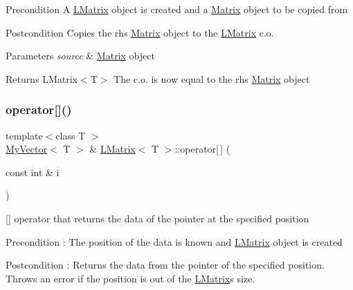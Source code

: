 \begin{DoxyPrecond}{Precondition}
A \mbox{\hyperlink{class_l_matrix}{L\+Matrix}} object is created and a \mbox{\hyperlink{class_matrix}{Matrix}} object to be copied from 
\end{DoxyPrecond}
\begin{DoxyPostcond}{Postcondition}
Copies the rhs \mbox{\hyperlink{class_matrix}{Matrix}} object to the \mbox{\hyperlink{class_l_matrix}{L\+Matrix}} c.\+o. 
\end{DoxyPostcond}

\begin{DoxyParams}{Parameters}
{\em source} & \mbox{\hyperlink{class_matrix}{Matrix}} object \\
\hline
\end{DoxyParams}
\begin{DoxyReturn}{Returns}
L\+Matrix$<$\+T$>$ The c.\+o. is now equal to the rhs \mbox{\hyperlink{class_matrix}{Matrix}} object 
\end{DoxyReturn}
\mbox{\label{class_l_matrix_a7eab2a6c57437448d21a04484844e359}} 
\subsubsection{\texorpdfstring{operator[]()}{operator[]()}\hspace{0.1cm}{\footnotesize\ttfamily [1/2]}}
{\footnotesize\ttfamily template$<$class T $>$ \\
\mbox{\hyperlink{class_my_vector}{My\+Vector}}$<$ T $>$ \& \mbox{\hyperlink{class_l_matrix}{L\+Matrix}}$<$ T $>$\+::operator\mbox{[}$\,$\mbox{]} (\begin{DoxyParamCaption}\item[{const int \&}]{i }\end{DoxyParamCaption})\hspace{0.3cm}{\ttfamily [virtual]}}



\mbox{[}\mbox{]} operator that returns the data of the pointer at the specified position 

\begin{DoxyPrecond}{Precondition}
\+: The position of the data is known and \mbox{\hyperlink{class_l_matrix}{L\+Matrix}} object is created 
\end{DoxyPrecond}
\begin{DoxyPostcond}{Postcondition}
\+: Returns the data from the pointer of the specified position. Throws an error if the position is out of the \mbox{\hyperlink{class_l_matrix}{L\+Matrix}}\textquotesingle{}s size. 
\end{DoxyPostcond}

